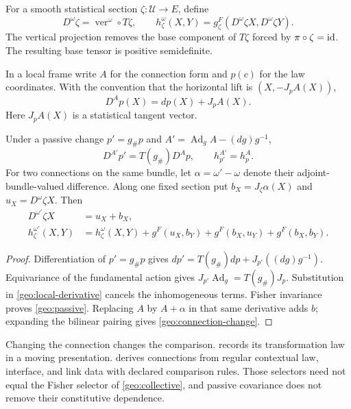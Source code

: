 For a smooth statistical section $\zeta:\mathcal U\to E$, define
\begin{equation}
D^\omega\zeta=\operatorname{ver}^\omega\circ T\zeta,
\qquad
h^\omega_\zeta(X,Y)
=g^F_\zeta(D^\omega\zeta X,D^\omega\zeta Y).
\label{geo:pullback-formula}
\end{equation}
The vertical projection removes the base component of $T\zeta$ forced by $\pi\circ\zeta=\mathrm{id}$. The resulting base tensor is positive semidefinite.

In a local frame write $A$ for the connection form and $p(c)$ for the law coordinates. With the convention that the horizontal lift is $(X,-J_pA(X))$,
\begin{equation}
D^A p(X)=dp(X)+J_pA(X).
\label{geo:local-derivative}
\end{equation}
Here $J_pA(X)$ is a statistical tangent vector.

Under a passive change $p'=g_\#p$ and
$A'=\operatorname{Ad}_g A-(dg)g^{-1}$,
\begin{equation}
D^{A'}p'=T(g_\#)D^A p,
\qquad h^{A'}_{p'}=h^A_p.
\label{geo:passive}
\end{equation}
For two connections on the same bundle, let $\alpha=\omega'-\omega$ denote their adjoint-bundle-valued difference. Along one fixed section put $b_X=J_\zeta\alpha(X)$ and $u_X=D^\omega\zeta X$. Then
\begin{align}
D^{\omega'}\zeta X&=u_X+b_X,\\
h^{\omega'}_\zeta(X,Y)
&=h^\omega_\zeta(X,Y)+g^F(u_X,b_Y)+g^F(b_X,u_Y)+g^F(b_X,b_Y).
\label{geo:connection-change}
\end{align}
\begin{proof}
Differentiation of $p'=g_\#p$ gives $dp'=T(g_\#)dp+J_{p'}((dg)g^{-1})$. Equivariance of the fundamental action gives $J_{p'}\operatorname{Ad}_g=T(g_\#)J_p$. Substitution in \cref{geo:local-derivative} cancels the inhomogeneous terms. Fisher invariance proves \cref{geo:passive}. Replacing $A$ by $A+\alpha$ in that same derivative adds $b$; expanding the bilinear pairing gives \cref{geo:connection-change}.
\end{proof}

Changing the connection changes the comparison.  records its transformation law in a moving presentation.  derives connections from regular contextual law, interface, and link data with declared comparison rules. Those selectors need not equal the Fisher selector of \cref{geo:collective}, and passive covariance does not remove their constitutive dependence.

